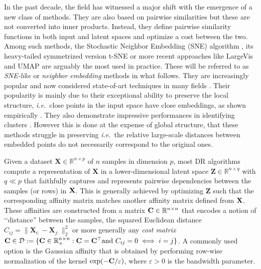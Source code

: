 In the past decade, the field has witnessed a major shift with the emergence of a new class of methods. They are also based on pairwise similarities but these are not converted into inner products. Instead, they define pairwise similarity functions in both input and latent spaces and optimize a cost between the two. Among such methods, the Stochastic Neighbor Embedding (SNE) algorithm \citep{NIPS2002SNE}, its heavy-tailed symmetrized version t-SNE \citep{maaten2008tSNE} or more recent approaches like LargeVis \citep{tang2016visualizing} and UMAP \citep{mcinnes2018umap} are arguably the most used in practice. These will be referred to as \textit{SNE-like} or \textit{neighbor embedding} methods in what follows. They are increasingly popular and now considered state-of-art techniques in many fields \citep{li2017application,kobak2019art,anders2018dissecting}. Their popularity is mainly due to their exceptional ability to preserve the local structure, \textit{i.e.}\ close points in the input space have close embeddings, as shown empirically \citep{wang2021understanding}. They also demonstrate impressive performances in identifying clusters \citep{arora2018analysis, linderman2019clustering}. However this is done at the expense of global structure, that these methods struggle in preserving \citep{wattenberg2016use, coenen2019understanding} \textit{i.e.}\ the relative large-scale distances between embedded points do not necessarily correspond to the original ones.

Given a dataset $\mathbf{X} \in \mathbb{R}^{n \times p}$ of $n$ samples in dimension $p$, most DR algorithms compute a representation of $\mathbf{X}$ in a lower-dimensional latent space $\mathbf{Z} \in \mathbb{R}^{n \times q}$ with $q \ll p$ that faithfully captures and represents pairwise dependencies between the samples (or rows) in $\mathbf{X}$. This is generally achieved by optimizing $\mathbf{Z}$ such that the corresponding affinity matrix matches another affinity matrix defined from $\mathbf{X}$. These affinities are constructed from a matrix $\mathbf{C} \in \mathbb{R}^{n \times n}$ that encodes a notion of ‘‘distance'' between the samples, \eg the squared Euclidean distance $C_{ij} = \|\mathbf{X}_{i:}-\mathbf{X}_{j:}\|_2^2$ or more generally any \emph{cost matrix} $\mathbf{C} \in \mathcal{D} := \{\mathbf{C} \in \mathbb{R}_+^{n \times n} : \mathbf{C} = \mathbf{C}^\top \text{and } C_{ij}=0 \iff i=j\}$. A commonly used option is the Gaussian affinity that is obtained by performing row-wise normalization of the kernel $\exp(-\mathbf{C} / \varepsilon)$, where $\varepsilon >0$ is the bandwidth parameter.




